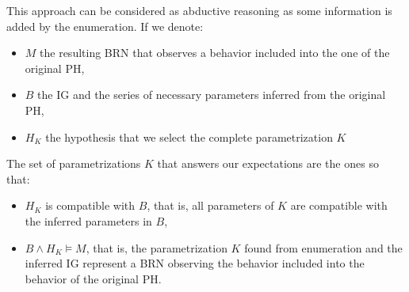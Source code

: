\begin{comment}
When building a BRN, one has to find the parametrization that best describes the desired behavior of the studied system.
Complexity is inherent to this process as the number of possible parametrizations for a given IG is exponential w.r.t. the number of components.
However, the method of parameters inference presented in the previous subsection gives some information about necessary parameters given a certain dynamics described by a PH.
This information thus drops the number of possible parametrizations, allowing to find the desired behavior more easily.

We first delimit the validity of a parameter (\pref{pro:K-valid}) in order to ensure that any
transition in the resulting BRN is allowed by the studied PH.
This is verified by the existence of a hit making the concerned component bounce into the direction
of the value of the parameter in the matching context.
Thus, assuming \pref{pro:wf-ph-K} holds, any transition in the inferred BRN corresponds to at least
one transition in the PH, proving the correctness of our inference.
We remark that any parameter inferred by \pref{pps:param_K} satisfies this property.
Then, we use some additional biological constraints on Thomas' parameters given in
\cite{BernotSemBRN}, that we sum up in Properties \pref{prop:param_enum_extreme},
\pref{prop:param_enum_activity} and \pref{prop:param_enum_monotonicity}.
\end{comment}

This approach can be considered as abductive reasoning as some information is added by the enumeration.
If we denote:
\begin{itemize}
  \item $M$ the resulting BRN that observes a behavior included into the one of the original PH,
  \item $B$ the IG and the series of necessary parameters inferred from the original PH,
  \item $H_K$ the hypothesis that we select the complete parametrization $K$
\end{itemize}
The set of parametrizations $K$ that answers our expectations are the ones so that:
\begin{itemize}
  \item $H_K$ is compatible with $B$, that is, all parameters of $K$ are compatible with the inferred parameters in $B$,
  \item $B \wedge H_K \models M$, that is, the parametrization $K$ found from enumeration and the inferred IG represent a BRN observing the behavior included into the behavior of the original PH.
\end{itemize}

